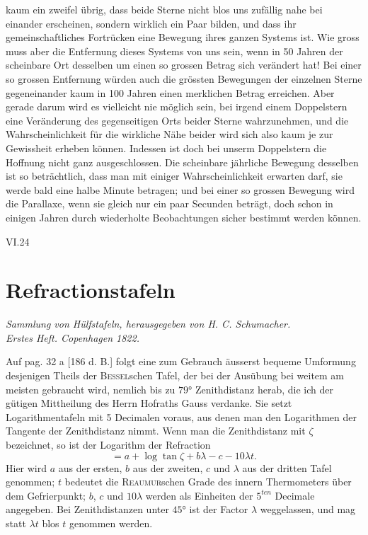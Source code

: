 \documentclass[10pt,a4paper]{article}
\begin{document}
\clearpage
\noindent
kaum ein zweifel übrig, dass beide Sterne nicht blos uns zufällig nahe bei einander erscheinen, sondern wirklich ein Paar bilden, und dass ihr gemeinschaftliches Fortrücken eine Bewegung ihres ganzen Systems ist. Wie gross muss aber die Entfernung dieses Systems von uns sein, wenn in 50 Jahren der scheinbare Ort desselben um einen so grossen Betrag sich verändert hat! Bei einer so grossen Entfernung würden auch die grössten Bewegungen der einzelnen Sterne gegeneinander kaum in 100 Jahren einen merklichen Betrag erreichen. Aber gerade darum wird es vielleicht nie möglich sein, bei irgend einem Doppelstern eine Veränderung des gegenseitigen Orts beider Sterne wahrzunehmen, und die Wahrscheinlichkeit für die wirkliche Nähe beider wird sich also kaum je zur Gewissheit erheben können. Indessen ist doch bei unserm Doppelstern die Hoffnung nicht ganz ausgeschlossen. Die scheinbare jährliche Bewegung desselben ist so beträchtlich, dass man mit einiger Wahrscheinlichkeit erwarten darf, sie werde bald eine halbe Minute betragen; und bei einer so grossen Bewegung wird die Parallaxe, wenn sie gleich nur ein paar Secunden beträgt, doch schon in einigen Jahren durch wiederholte Beobachtungen sicher bestimmt werden können.

\vspace{1em}
\noindent\textsc{VI.}\hfill 24

\clearpage
\section*{Refractionstafeln}

\begin{center}
\small
\textit{Sammlung von Hülfstafeln, herausgegeben von H. C. Schumacher.}\\
\textit{Erstes Heft. Copenhagen 1822.}
\end{center}

\medskip
\noindent
Auf pag. 32 a [186 d. B.] folgt eine zum Gebrauch äusserst bequeme Umformung desjenigen Theils der \textsc{Bessel}schen Tafel, der bei der Ausübung bei weitem am meisten gebraucht wird, nemlich bis zu $79°$ Zenithdistanz herab, die ich der gütigen Mittheilung des Herrn Hofraths Gauss verdanke. Sie setzt Logarithmentafeln mit 5 Decimalen voraus, aus denen man den Logarithmen der Tangente der Zenithdistanz nimmt. Wenn man die Zenithdistanz mit $\zeta$ bezeichnet, so ist der Logarithm der Refraction
\[
= a + \log\tan\zeta + b\lambda - c - 10\lambda t.
\]
Hier wird $a$ aus der ersten, $b$ aus der zweiten, $c$ und $\lambda$ aus der dritten Tafel genommen; $t$ bedeutet die \textsc{Reaumur}schen Grade des innern Thermometers über dem Gefrierpunkt; $b$, $c$ und $10\lambda$ werden als Einheiten der $5^{ten}$ Decimale angegeben. Bei Zenithdistanzen unter $45°$ ist der Factor $\lambda$ weggelassen, und mag statt $\lambda t$ blos $t$ genommen werden.
\end{document}
